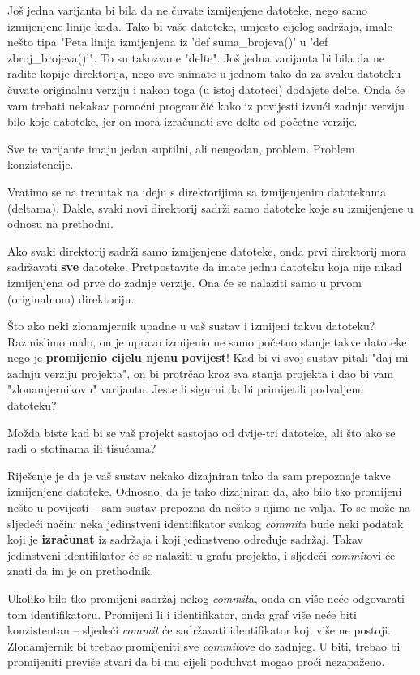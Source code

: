 Još jedna varijanta bi bila da ne čuvate izmijenjene datoteke, nego samo izmijenjene linije koda.
Tako bi vaše datoteke, umjesto cijelog sadržaja, imale nešto tipa "Peta linija izmijenjena iz 'def suma\_brojeva()' u 'def zbroj\_brojeva()'".
To su takozvane "delte".
Još jedna varijanta bi bila da ne radite kopije direktorija, nego sve snimate u jednom tako da za svaku datoteku čuvate originalnu verziju i nakon toga (u istoj datoteci) dodajete delte.
Onda će vam trebati nekakav pomoćni programčić kako iz povijesti izvući zadnju verziju bilo koje datoteke, jer on mora izračunati sve delte od početne verzije.

Sve te varijante imaju jedan suptilni, ali neugodan, problem.
Problem konzistencije.

Vratimo se na trenutak na ideju s direktorijima sa izmijenjenim datotekama (deltama).
Dakle, svaki novi direktorij sadrži samo datoteke koje su izmijenjene u odnosu na prethodni.

Ako svaki direktorij sadrži samo izmijenjene datoteke, onda prvi direktorij mora sadržavati \textbf{sve} datoteke.
Pretpostavite da imate jednu datoteku koja nije nikad izmijenjena od prve do zadnje verzije. 
Ona će se nalaziti samo u prvom (originalnom) direktoriju.

Što ako neki zlonamjernik upadne u vaš sustav i izmijeni takvu datoteku?
Razmislimo malo, on je upravo izmijenio ne samo početno stanje takve datoteke nego je \textbf{promijenio cijelu njenu povijest}!
Kad bi vi svoj sustav pitali "daj mi zadnju verziju projekta", on bi protrčao kroz sva stanja projekta i dao bi vam "zlonamjernikovu" varijantu.
Jeste li sigurni da bi primijetili podvaljenu datoteku?

Možda biste kad bi se vaš projekt sastojao od dvije-tri datoteke, ali što ako se radi o stotinama ili tisućama?

Riješenje je da je vaš sustav nekako dizajniran tako da sam prepoznaje takve izmijenjene datoteke. 
Odnosno, da je tako dizajniran da, ako bilo tko promijeni nešto u povijesti -- sam sustav prepozna da nešto s njime ne valja.
To se može na sljedeći način: neka jedinstveni identifikator svakog \emph{commit}a bude neki podatak koji je \textbf{izračunat} iz sadržaja i koji jedinstveno određuje sadržaj.
Takav jedinstveni identifikator će se nalaziti u grafu projekta, i sljedeći \emph{commit}ovi će znati da im je on prethodnik.

Ukoliko bilo tko promijeni sadržaj nekog \emph{commit}a, onda on više neće odgovarati tom identifikatoru.
Promijeni li i identifikator, onda graf više neće biti konzistentan -- sljedeći \emph{commit} će sadržavati identifikator koji više ne postoji.
Zlonamjernik bi trebao promijeniti sve \emph{commit}ove do zadnjeg. 
U biti, trebao bi promijeniti previše stvari da bi mu cijeli poduhvat mogao proći nezapaženo.

